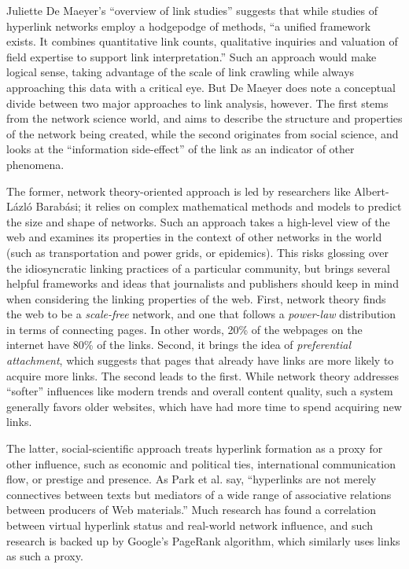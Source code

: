 Juliette De Maeyer's ``overview of link studies'' suggests that while studies of hyperlink networks employ a hodgepodge of methods, ``a unified framework exists. It combines quantitative link counts, qualitative inquiries and valuation of field expertise to support link interpretation.''\autocite[737]{de_maeyer_towards_2013} Such an approach would make logical sense, taking advantage of the scale of link crawling while always approaching this data with a critical eye. But De Maeyer does note a conceptual divide between two major approaches to link analysis, however. The first stems from the network science world, and aims to describe the structure and properties of the network being created, while the second originates from social science, and looks at the ``information side-effect'' of the link as an indicator of other phenomena.

The former, network theory-oriented approach is led by researchers like Albert-L\'{a}zl\'{o} Barab\'{a}si; it relies on complex mathematical methods and models to predict the size and shape of networks. Such an approach takes a high-level view of the web and examines its properties in the context of other networks in the world (such as transportation and power grids, or epidemics). This risks glossing over the idiosyncratic linking practices of a particular community, but brings several helpful frameworks and ideas that journalists and publishers should keep in mind when considering the linking properties of the web. First, network theory finds the web to be a \emph{scale-free} network, and one that follows a \emph{power-law} distribution in terms of connecting pages. In other words, 20\% of the webpages on the internet have 80\% of the links.\autocite{find the ACTUAL number for this} Second, it brings the idea of \emph{preferential attachment}, which suggests that pages that already have links are more likely to acquire more links. The second leads to the first. While network theory addresses ``softer'' influences like modern trends and overall content quality, such a system generally favors older websites, which have had more time to spend acquiring new links.

The latter, social-scientific approach treats hyperlink formation as a proxy for other influence, such as economic and political ties, international communication flow, or prestige and presence. As Park et al. say, ``hyperlinks are not merely connectives between texts but mediators of a wide range of associative relations between producers of Web materials.''\autocite{park_sociology_????} Much research has found a correlation between virtual hyperlink status and real-world network influence, and such research is backed up by Google's PageRank algorithm, which similarly uses links as such a proxy.

